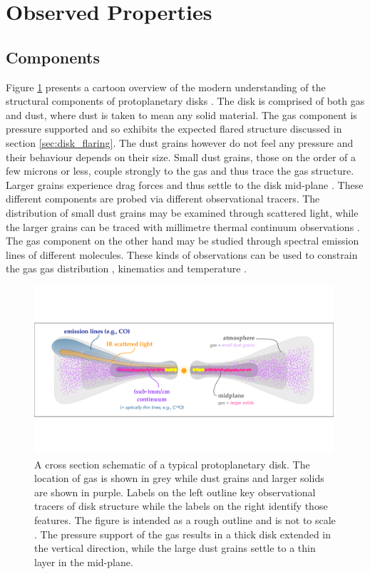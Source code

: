 \section{Observed Properties}

\subsection{Components}

Figure \ref{fig:struct_cartoon} presents a cartoon overview of the modern understanding of the structural components of protoplanetary disks \citep{andrews2020}.
The disk is comprised of both gas and dust, where dust is taken to mean any solid material.
The gas component is pressure supported and so exhibits the expected flared structure discussed in section \ref{sec:disk_flaring}.
The dust grains however do not feel any pressure and their behaviour depends on their size.
Small dust grains, those on the order of a few microns or less, couple strongly to the gas and thus trace the gas structure.
Larger grains experience drag forces and thus settle to the disk mid-plane \citep{nakagawa1986}.
These different components are probed via different observational tracers.
The distribution of small dust grains may be examined through scattered light, while the larger grains can be traced with millimetre thermal continuum observations \citep{almapartnership2015,andrews2016,ansdell2016}. 
The gas component on the other hand may be studied through spectral emission lines of different molecules.
These kinds of observations can be used to constrain the gas gas distribution \citep{vandermarel2015,ansdell2016,zhang2021}, kinematics \citep{perez2015,pinte2018a,teague2018,pinte2019,yu2021,calcino2022} and temperature \citep{pinte2018,calahan2021}.

\begin{figure}
    \centering
    \includegraphics[width = 0.99\textwidth]{figures/cartoon_overview.pdf}
    \caption{A cross section schematic of a typical protoplanetary disk. The location of gas is shown in grey while dust grains and larger solids are shown in purple. Labels on the left outline key observational tracers of disk structure while the labels on the right identify those features. The figure is intended as a rough outline and is not to scale \citep[see review by][]{andrews2020}. The pressure support of the gas results in a thick disk extended in the vertical direction, while the large dust grains settle to a thin layer in the mid-plane.}
    \label{fig:struct_cartoon}
\end{figure}

